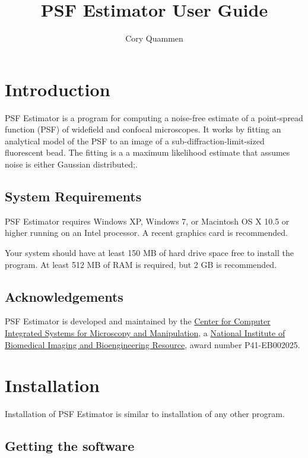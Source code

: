 \documentclass[11pt,titlepage,twoside]{article}
\title{PSF Estimator \ProgramVersion User Guide}
\author{Cory Quammen}
\begin{document}
\maketitle
\tableofcontents
\vfill

\pagebreak

\section{Introduction}

PSF Estimator is a program for computing a noise-free estimate of a point-spread function (PSF) of widefield and confocal microscopes. It works by fitting an analytical model of the PSF to an image of a sub-diffraction-limit-sized fluorescent bead. The fitting is a a maximum likelihood estimate that assumes noise is either Gaussian distributed;.

\subsection{System Requirements}

PSF Estimator \ProgramVersion requires Windows XP, Windows 7, or Macintosh OS X 10.5 or higher running on an Intel processor. A recent graphics card is recommended.

Your system should have at least 150 MB of hard drive space free to install the program. At least 512 MB of RAM is required, but 2 GB is recommended.

\subsection{Acknowledgements}

PSF Estimator \ProgramVersion is developed and maintained by the \href{http://www.cismm.org}{Center for Computer Integrated Systems for Microscopy and Manipulation}, a \href{http://www.nibib.nih.gov/}{National Institute of Biomedical Imaging and Bioengineering Resource}, award number P41-EB002025.

\section{Installation}

Installation of PSF Estimator \ProgramVersion is similar to installation of any other program.

\subsection{Getting the software}
\end{document}
